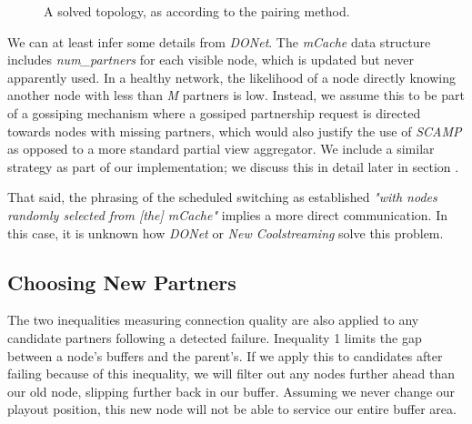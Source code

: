 \documentclass[12pt,a4paper]{article}
\begin{document}
\begin{figure}[!ht]
	\centering
	\caption{A solved topology, as according to the pairing method.}
	\label{some label}
\end{figure}

We can at least infer some details from \textit{DONet}. The \textit{mCache} data structure includes \textit{num\_partners} for each visible node, which is updated but never apparently used. In a healthy network, the likelihood of a node directly knowing another node with less than \textit{M} partners is low. Instead, we assume this to be part of a gossiping mechanism where a gossiped partnership request is directed towards nodes with missing partners, which would also justify the use of \textit{SCAMP} as opposed to a more standard partial view aggregator. We include a similar strategy as part of our implementation; we discuss this in detail later in section .

That said, the phrasing of the scheduled switching as established \textit{"with nodes randomly selected from [the] mCache"} implies a more direct communication. In this case, it is unknown how \textit{DONet} or \textit{New Coolstreaming} solve this problem.

\subsection{Choosing New Partners}
The two inequalities measuring connection quality are also applied to any candidate partners following a detected failure. Inequality 1 limits the gap between a node's  buffers and the parent's. If we apply this to candidates after failing because of this inequality, we will filter out any nodes further ahead than our old node, slipping further back in our buffer. Assuming we never change our playout position, this new node will not be able to service our entire buffer area.
\end{document}
